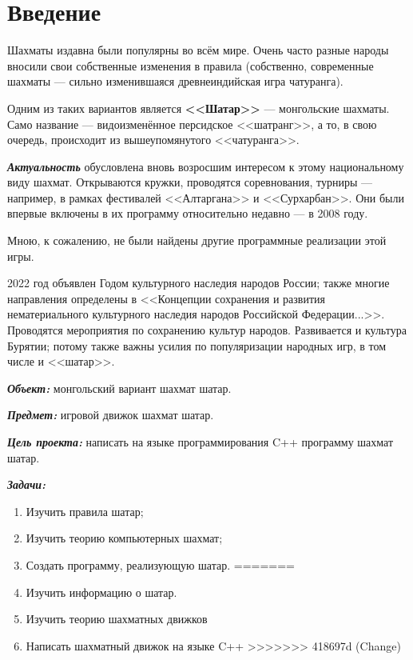{
	\chapter*{Введение}
	Шахматы издавна были популярны во всём мире. Очень часто разные народы вносили свои собственные изменения в правила (собственно, современные шахматы --- сильно изменившаяся древнеиндийская игра чатуранга). 
	
	Одним из таких вариантов является \textbf{<<Шатар>>} --- монгольские шахматы. Само название --- видоизменённое персидское <<шатранг>>, а то, в свою очередь, происходит из вышеупомянутого <<чатуранга>>.
	
	\textbf{\textit{Актуальность}} обусловлена вновь возросшим интересом к этому национальному виду шахмат. Открываются кружки, проводятся соревнования, турниры --- например, в рамках фестивалей <<Алтаргана>> и <<Сурхарбан>>. Они были впервые включены в их программу относительно недавно --- в 2008 году.
	
	Мною, к сожалению, не были найдены другие программные реализации этой игры.
	
	2022 год  объявлен Годом культурного наследия народов России; также многие направления определены в <<Концепции сохранения и развития нематериального культурного наследия народов Российской Федерации...>>. Проводятся мероприятия по сохранению культур народов. Развивается и культура Бурятии; потому  также важны  усилия по популяризации народных игр, в том числе и <<шатар>>.
	
	\textbf{\textit{Объект:}} монгольский вариант шахмат шатар.
	
	\textbf{\textit{Предмет:}} игровой движок шахмат шатар.
	
	\textbf{\textit{Цель проекта:}} написать на языке программирования C++ программу шахмат шатар.
	
	\textbf{\textit{Задачи:}}
	
	\begin{enumerate}
<<<<<<< HEAD
		\item Изучить правила шатар;
		\item Изучить теорию компьютерных шахмат;
		\item Создать программу, реализующую шатар.
=======
		\item Изучить информацию о шатар.
		\item Изучить теорию шахматных движков
		\item Написать шахматный движок на языке C++
>>>>>>> 418697d (Change)
	\end{enumerate}
	\clearpage
}